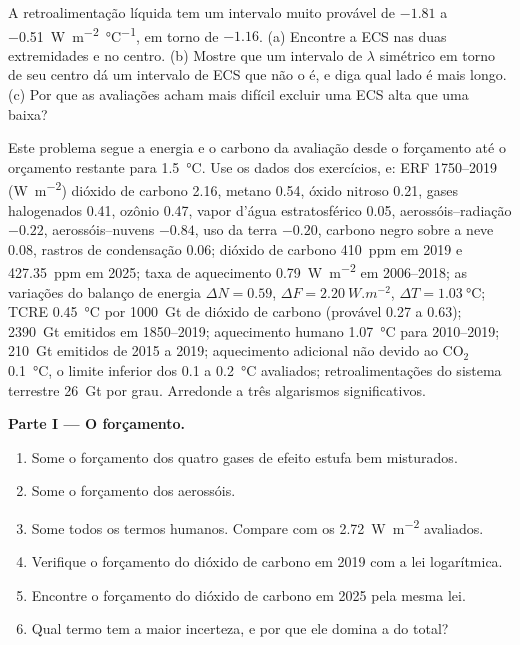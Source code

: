 \begin{exercise}[$\star\star\star$]\label{exo:b2:anthropogenic-climate-change:12}
A retroalimentação líquida tem um intervalo muito provável de $-1.81$ a \qty{-0.51}{W.m^{-2}.\celsius^{-1}}, em torno de
$-1.16$. (a) Encontre a ECS nas duas extremidades e no centro. (b) Mostre que um intervalo de $\lambda$
simétrico em torno de seu centro dá um intervalo de ECS que não o é, e diga qual lado é mais longo. (c) Por que
as avaliações acham mais difícil excluir uma ECS alta que uma baixa?
\end{exercise}

\begin{problem}\label{pb:b2:anthropogenic-climate-change:1}
Este problema segue a energia e o carbono da avaliação desde o forçamento até o orçamento
restante para \qty{1.5}{\celsius}. Use os dados dos exercícios, e: ERF 1750--2019 (\unit{W.m^{-2}})
dióxido de carbono 2.16, metano 0.54, óxido nitroso 0.21, gases halogenados 0.41, ozônio 0.47,
vapor d'água estratosférico 0.05, aerossóis--radiação $-0.22$, aerossóis--nuvens $-0.84$, uso da terra
$-0.20$, carbono negro sobre a neve 0.08, rastros de condensação 0.06; dióxido de carbono \qty{410}{ppm} em 2019 e
\qty{427.35}{ppm} em 2025; taxa de aquecimento \qty{0.79}{W.m^{-2}} em 2006--2018; as variações do balanço de energia
$\Delta N = 0.59$, $\Delta F = \qty{2.20}{W.m^{-2}}$, $\Delta T = \qty{1.03}{\celsius}$; TCRE
\qty{0.45}{\celsius} por \qty{1000}{Gt} de dióxido de carbono (provável 0.27 a 0.63); \qty{2390}{Gt}
emitidos em 1850--2019; aquecimento humano \qty{1.07}{\celsius} para 2010--2019; \qty{210}{Gt} emitidos de
2015 a 2019; aquecimento adicional não devido ao CO$_2$ \qty{0.1}{\celsius}, o limite inferior dos 0.1
a \qty{0.2}{\celsius} avaliados; retroalimentações do sistema terrestre \qty{26}{Gt} por grau. Arredonde a três algarismos
significativos.

\noindent\textbf{Parte I --- O forçamento.}
\begin{enumerate}
  \item Some o forçamento dos quatro gases de efeito estufa bem misturados.
  \item Some o forçamento dos aerossóis.
  \item Some todos os termos humanos. Compare com os \qty{2.72}{W.m^{-2}} avaliados.
  \item Verifique o forçamento do dióxido de carbono em 2019 com a lei logarítmica.
  \item Encontre o forçamento do dióxido de carbono em 2025 pela mesma lei.
  \item Qual termo tem a maior incerteza, e por que ele domina a do total?
\end{enumerate}


\end{problem}
